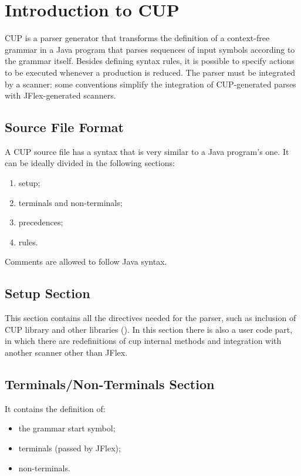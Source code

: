 \section{Introduction to CUP}
CUP is a parser generator that transforms the definition of a context-free grammar in a Java program that parses sequences of input symbols according to the grammar itself.
Besides defining syntax rules, it is possible to specify actions to be executed whenever a production is reduced.
The parser must be integrated by a scanner: some conventions simplify the integration of CUP-generated parses with JFlex-generated scanners.

\subsection{Source File Format}
A CUP source file has a syntax that is very similar to a Java program's one.
It can be ideally divided in the following sections:
\begin{enumerate}
    \item
    setup;
    \item
    terminals and non-terminals;
    \item
    precedences;
    \item
    rules.
\end{enumerate}

Comments are allowed to follow Java syntax.

\subsection{Setup Section}
This section contains all the directives needed for the parser, such as inclusion of CUP library and other libraries ().
In this section there is also a user code part, in which there are redefinitions of cup internal methods and integration with another scanner other than JFlex.

\subsection{Terminals/Non-Terminals Section}
It contains the definition of:
\begin{itemize}
    \item
    the grammar start symbol;
    \item
    terminals (passed by JFlex);
    \item
    non-terminals.
\end{itemize}

